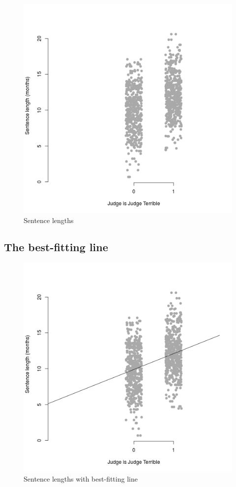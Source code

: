 \documentclass[12pt,twoside]{article}
\begin{document}
\begin{figure}[htbp]
\centering
\includegraphics{figure/tendergraph-1.png}
\caption{Sentence lengths}
\end{figure}

\subsection{The best-fitting line}\label{the-best-fitting-line-1}

\begin{figure}[htbp]
\centering
\includegraphics{figure/tenderbestfit-1.png}
\caption{Sentence lengths with best-fitting line}
\end{figure}
\end{document}
